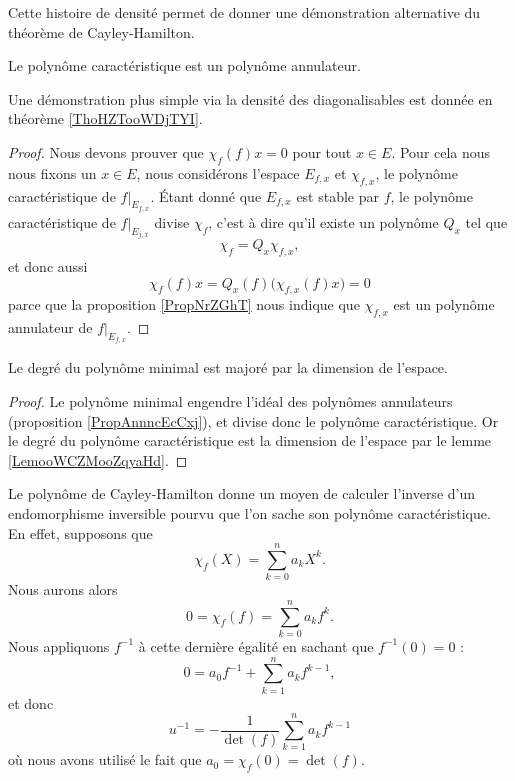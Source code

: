Cette histoire de densité permet de donner une démonstration alternative du théorème de Cayley-Hamilton.
\begin{theorem}   \label{ThoCalYWLbJQ}
    Le polynôme caractéristique est un polynôme annulateur.
\end{theorem}

Une démonstration plus simple via la densité des diagonalisables est donnée en théorème \ref{ThoHZTooWDjTYI}.
\begin{proof}
    Nous devons prouver que \( \chi_f(f)x=0\) pour tout \( x\in E\). Pour cela nous nous fixons un \( x\in E\), nous considérons l'espace \( E_{f,x}\) et \( \chi_{f,x}\), le polynôme caractéristique de \( f|_{E_{f,x}}\). Étant donné que \( E_{f,x}\) est stable par \( f\), le polynôme caractéristique de \( f|_{E_{j,x}}\) divise \( \chi_f\), c'est à dire qu'il existe un polynôme \( Q_x\) tel que
    \begin{equation}
        \chi_f=Q_x\chi_{f,x},
    \end{equation}
    et donc aussi
    \begin{equation}
        \chi_f(f)x=Q_x(f)\big( \chi_{f,x}(f)x \big)=0
    \end{equation}
    parce que la proposition \ref{PropNrZGhT} nous indique que \( \chi_{f,x}\) est un polynôme annulateur de \( f|_{E_{f,x}}\).
\end{proof}

\begin{corollary}
    Le degré du polynôme minimal est majoré par la dimension de l'espace.
\end{corollary}

\begin{proof}
    Le polynôme minimal engendre l'idéal des polynômes annulateurs (proposition \ref{PropAnnncEcCxj}), et divise donc le polynôme caractéristique. Or le degré du polynôme caractéristique est la dimension de l'espace par le lemme \ref{LemooWCZMooZqyaHd}.
\end{proof}

\begin{example}
    Le polynôme de Cayley-Hamilton donne un moyen de calculer l'inverse d'un endomorphisme inversible pourvu que l'on sache son polynôme caractéristique. En effet, supposons que
    \begin{equation}
        \chi_f(X)=\sum_{k=0}^na_kX^k.
    \end{equation}
    Nous aurons alors
    \begin{equation}
        0=\chi_f(f)=\sum_{k=0}^na_kf^k.
    \end{equation}
    Nous appliquons \( f^{-1}\) à cette dernière égalité en sachant que \( f^{-1}(0)=0\) :
    \begin{equation}
        0=a_0f^{-1}+\sum_{k=1}^na_kf^{k-1},
    \end{equation}
    et donc
    \begin{equation}
        u^{-1}=-\frac{1}{ \det(f) }\sum_{k=1}^na_kf^{k-1}
    \end{equation}
    où nous avons utilisé le fait que \( a_0=\chi_f(0)=\det(f)\).
\end{example}

